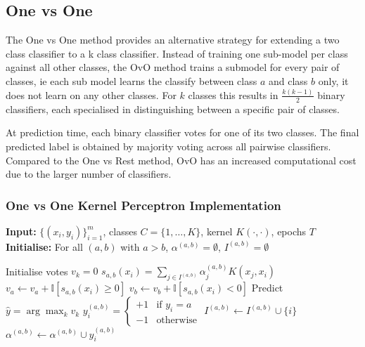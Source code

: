 \subsection{One vs One}
The One vs One method provides an alternative strategy for extending a two class classifier to a k class classifier. Instead of training one sub-model per class against all other classes, the OvO method trains a submodel for every pair of classes, ie each sub model learns the classify between class $a$ and class $b$ only, it does not learn on any other classes. For $k$ classes this results in $\frac{k(k-1)}{2}$ binary classifiers, each specialised in distinguishing between a specific pair of classes.

At prediction time, each binary classifier votes for one of its two classes. The final predicted label is obtained by majority voting across all pairwise classifiers. Compared to the One vs Rest method, OvO has an increased computational cost due to the larger number of classifiers.

\subsubsection{One vs One Kernel Perceptron Implementation}
\begin{algorithm}[H]
\caption{One-vs-One Online Kernel Perceptron}
\begin{algorithmic}[1]

\STATE \textbf{Input:} $\{(x_i,y_i)\}_{i=1}^m$, classes $C=\{1,\dots,K\}$, kernel $K(\cdot,\cdot)$, epochs $T$
\STATE \textbf{Initialise:} For all $(a,b)$ with $a>b$,
$\alpha^{(a,b)}=\emptyset$, $I^{(a,b)}=\emptyset$

        \STATE Initialise votes $v_k=0$
            \STATE $s_{a,b}(x_i)=\sum_{j\in I^{(a,b)}} \alpha^{(a,b)}_j K(x_j,x_i)$
            \STATE $v_a \leftarrow v_a + \mathbb{I}[s_{a,b}(x_i)\ge 0]$
            \STATE $v_b \leftarrow v_b + \mathbb{I}[s_{a,b}(x_i)<0]$
        \ENDFOR
        \STATE Predict $\hat y=\arg\max_k v_k$ 
            \STATE
            $
            y_i^{(a,b)} =
            \begin{cases}
            +1 & \text{if } y_i = a \\
            -1 & \text{otherwise}
            \end{cases}
            $
                \STATE $I^{(a,b)} \leftarrow I^{(a,b)} \cup \{i\}$
                \STATE $\alpha^{(a,b)} \leftarrow \alpha^{(a,b)} \cup y_i^{(a,b)}$
            \ENDIF
        \ENDFOR
    \ENDFOR
\ENDFOR

\end{algorithmic}
\end{algorithm}



